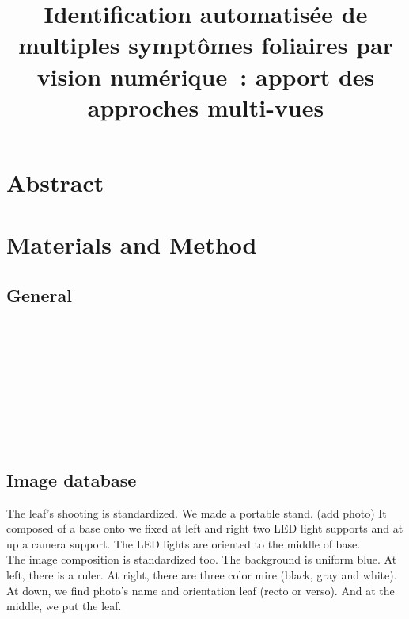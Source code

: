 \documentclass[english]{article}
\title{Identification automatisée de multiples symptômes foliaires par vision numérique : apport des approches multi-vues}
\begin{document}
\maketitle

\tableofcontents

\section{Abstract}

\section{Materials and Method}

\subsection{General}
\ttImgR
\\
\ttImgRV\\
\pAlt\\
\pBig\\
\pMac\\
\pMil\\
\pMyc\\
\pPse\\
\pSym
\subsection{Image database}
The leaf’s shooting is standardized. We made a portable stand. (add photo) It composed of  a base  onto we fixed at left and right two LED light supports and at up a camera support. The LED lights are oriented to the middle of base.
\\
The image composition is standardized too. The background is uniform blue. At left, there is a ruler. At right, there are three color mire (black, gray and white). At down, we find photo’s name and orientation leaf (recto or verso). And at the middle, we put the leaf.

\end{document}
